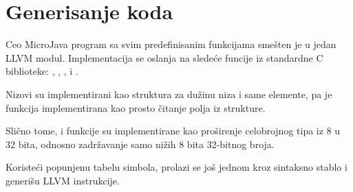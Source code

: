 \section{Generisanje koda}

Ceo MicroJava program sa svim predefinisanim funkcijama smešten je u jedan LLVM modul. Implementacija se oslanja na sledeće funcije iz standardne C biblioteke: ,
,
,
 i
.

Nizovi su implementirani kao struktura  za dužinu niza i same elemente, pa je  funkcija implementirana kao prosto čitanje polja iz strukture.

Slično tome,  i  funkcije su implementirane kao proširenje celobrojnog tipa iz 8 u 32 bita, odnosno zadržavanje samo nižih 8 bita 32-bitnog broja.

Koristeći popunjenu tabelu simbola, prolazi se još jednom kroz sintaksno stablo i generišu LLVM instrukcije.
